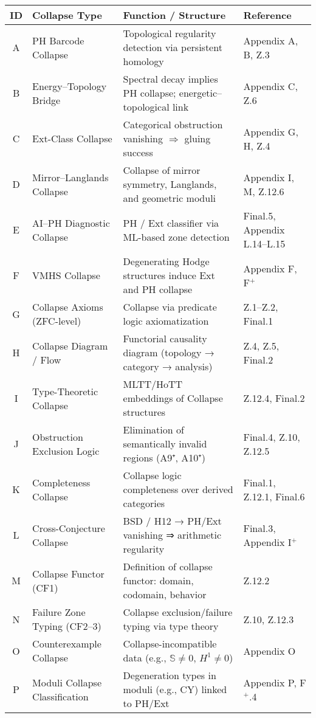 \documentclass[11pt]{article}
\newcommand{\Sha}{\mathbb{S}}
\begin{document}
\begin{axiom}
\begin{axiom}
{{\begin{center}
\renewcommand{\arraystretch}{1.4}
\setlength{\tabcolsep}{4pt}
\begin{tabularx}{\textwidth}{|c|X|X|X|}
\hline
\textbf{ID} & \textbf{Collapse Type} & \textbf{Function / Structure} & \textbf{Reference} \\
\hline
A & PH Barcode Collapse & Topological regularity detection via persistent homology & Appendix A, B, Z.3 \\
B & Energy–Topology Bridge & Spectral decay implies PH collapse; energetic–topological link & Appendix C, Z.6 \\
C & Ext-Class Collapse & Categorical obstruction vanishing $\Rightarrow$ gluing success & Appendix G, H, Z.4 \\
D & Mirror–Langlands Collapse & Collapse of mirror symmetry, Langlands, and geometric moduli & Appendix I, M, Z.12.6 \\
E & AI–PH Diagnostic Collapse & PH / Ext classifier via ML-based zone detection & Final.5, Appendix L.14–L.15 \\
F & VMHS Collapse & Degenerating Hodge structures induce Ext and PH collapse & Appendix F, F$^+$ \\
G & Collapse Axioms (ZFC-level) & Collapse via predicate logic axiomatization & Z.1–Z.2, Final.1 \\
H & Collapse Diagram / Flow & Functorial causality diagram (topology → category → analysis) & Z.4, Z.5, Final.2 \\
I & Type-Theoretic Collapse & MLTT/HoTT embeddings of Collapse structures & Z.12.4, Final.2 \\
J & Obstruction Exclusion Logic & Elimination of semantically invalid regions (A9⁺, A10⁺) & Final.4, Z.10, Z.12.5 \\
K & Completeness Collapse & Collapse logic completeness over derived categories & Final.1, Z.12.1, Final.6 \\
L & Cross-Conjecture Collapse & BSD / H12 → PH/Ext vanishing ⇒ arithmetic regularity & Final.3, Appendix I$^+$ \\
M & Collapse Functor (CF1) & Definition of collapse functor: domain, codomain, behavior & Z.12.2 \\
N & Failure Zone Typing (CF2–3) & Collapse exclusion/failure typing via type theory & Z.10, Z.12.3 \\
O & Counterexample Collapse & Collapse-incompatible data (e.g., $\Sha \neq 0$, $H^1 \neq 0$) & Appendix O \\
P & Moduli Collapse Classification & Degeneration types in moduli (e.g., CY) linked to PH/Ext & Appendix P, F$^+$.4 \\

\end{tabularx}
\end{center}}}
\end{axiom}
\end{axiom}
\end{document}
